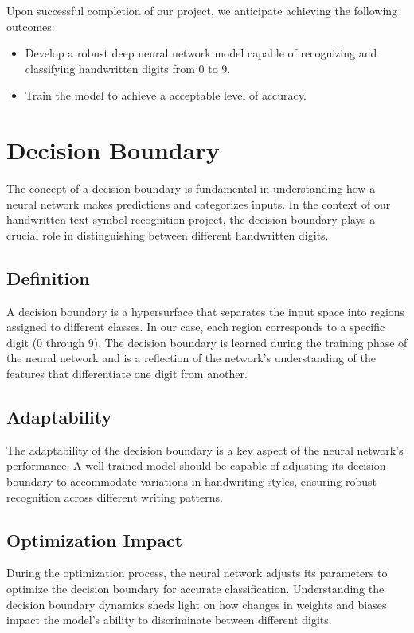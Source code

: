 \documentclass{article}
\begin{document}
Upon successful completion of our project, we anticipate achieving the following outcomes:

\begin{itemize}
    \item Develop a robust deep neural network model capable of recognizing and classifying handwritten digits from 0 to 9.
    \item Train the model to achieve a acceptable level of accuracy.
\end{itemize}

\newpage
\section{Decision Boundary}

The concept of a decision boundary is fundamental in understanding how a neural network makes predictions and categorizes inputs. In the context of our handwritten text symbol recognition project, the decision boundary plays a crucial role in distinguishing between different handwritten digits.

\subsection{Definition}
A decision boundary is a hypersurface that separates the input space into regions assigned to different classes. In our case, each region corresponds to a specific digit (0 through 9). The decision boundary is learned during the training phase of the neural network and is a reflection of the network's understanding of the features that differentiate one digit from another.

\subsection{Adaptability}
The adaptability of the decision boundary is a key aspect of the neural network's performance. A well-trained model should be capable of adjusting its decision boundary to accommodate variations in handwriting styles, ensuring robust recognition across different writing patterns.

\subsection{Optimization Impact}
During the optimization process, the neural network adjusts its parameters to optimize the decision boundary for accurate classification. Understanding the decision boundary dynamics sheds light on how changes in weights and biases impact the model's ability to discriminate between different digits.
\end{document}
